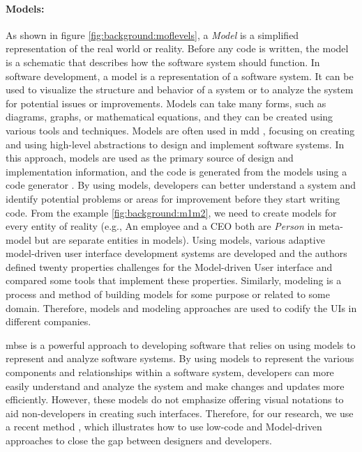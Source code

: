 \paragraph{Models:} 
As shown in figure \ref{fig:background:moflevels}, a \textit{Model} is a simplified representation of the real world or reality.
Before any code is written, the model is a schematic that describes how the software system should function.
In software development, a model is a representation of a software system. 
It can be used to visualize the structure and behavior of a system or to analyze the system for potential issues or improvements. 
Models can take many forms, such as diagrams, graphs, or mathematical equations, and they can be created using various tools and techniques. 
Models are often used in \ac{mdd} \cite{misc:metamodels:mdd}, focusing on creating and using high-level abstractions to design and implement software systems. 
In this approach, models are used as the primary source of design and implementation information, and the code is generated from the models using a code generator \cite{article:mbse:bexiga}. 
By using models, developers can better understand a system and identify potential problems or areas for improvement before they start writing code.
From the example \ref{fig:background:m1m2}, we need to create models for every entity of reality (e.g., An employee and a CEO both are \textit{Person} in meta-model but are separate entities in models).
Using models, various adaptive model-driven user interface development systems are developed \cite{article:mbse:akiki} and the authors defined twenty properties challenges for the Model-driven User interface and compared some tools that implement these properties.
Similarly, modeling is a process and method of building models for some purpose or related to some domain.
Therefore, models and modeling approaches are used to codify the UIs in different companies. 

\ac{mbse} is a powerful approach to developing software that relies on using models to represent and analyze software systems. 
By using models to represent the various components and relationships within a software system, developers can more easily understand and analyze the system and make changes and updates more efficiently.
However, these models do not emphasize offering visual notations to aid non-developers in creating such interfaces. 
Therefore, for our research, we use a recent method \cite{article:mbse:bexiga}, which illustrates how to use low-code and Model-driven approaches to close the gap between designers and developers.

